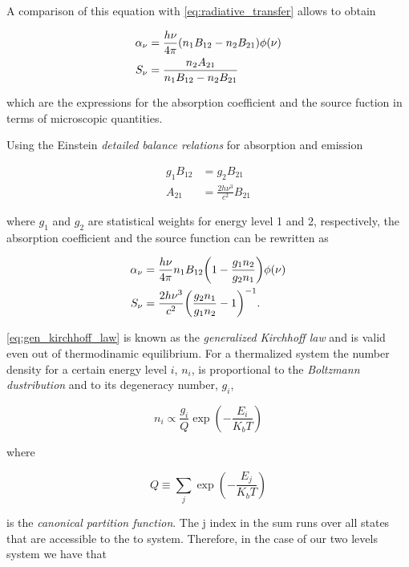 A comparison of this equation with \autoref{eq:radiative_transfer} allows
to obtain

\begin{align}
        \alpha_\nu & = \frac{h\nu}{4\pi}\qty(n_1 B_{12} -
        n_2 B_{21})\phi\qty(\nu) \\
        S_\nu & = \frac{n_2 A_{21}}{n_1 B_{12} - n_2 B_{21}}
\end{align}

which are the expressions for the absorption coefficient and the source
fuction in terms of microscopic quantities.

Using the Einstein \emph{detailed balance relations} for absorption and
emission

\begin{align}
        g_1 B_{12} & = g_2 B_{21} \\
        A_{21} & = \frac{2h\nu^3}{c^2} B_{21}
\end{align}

where $g_1$ and $g_2$ are statistical weights for energy level 1 and 2,
respectively, the absorption coefficient and the source function can be
rewritten as

\begin{align}
        \alpha_\nu & = \frac{h\nu}{4\pi} n_1 B_{12}
        \qty(1 - \frac{g_1 n_2}{g_2 n_1})\phi\qty(\nu)\\
        S_\nu & = \frac{2h\nu^3}{c^2}\qty(\frac{g_2 n_1}{g_1 n_2} - 1)^{-1}.
        \label{eq:gen_kirchhoff_law}
\end{align}

\autoref{eq:gen_kirchhoff_law} is known as the \emph{generalized Kirchhoff
law} and is valid even out of thermodinamic equilibrium. For a thermalized
system the number density for a certain energy level $i$, $n_i$, is
proportional to the \emph{Boltzmann dustribution} and to its degeneracy
number, $g_i$,

\begin{equation}
        n_i \propto \frac{g_i}{Q} \exp(-\frac{E_i}{K_b T})
\end{equation}

where

\begin{equation}
        Q \equiv \sum_j \exp(-\frac{E_j}{K_b T})
\end{equation}

is the \emph{canonical partition function}. The j index in the sum runs
over all states that are accessible to the to system. Therefore, in the
case of our two levels system we have that

